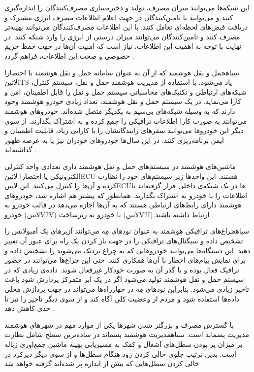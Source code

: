 این شبکه‌ها می‌توانند میزان مصرف، تولید و ذخیره‌سازی مصرف‌کنندگان را اندازه‌گیری کنند و می‌توانند با تامین‌کنندگان در جهت اعلام اطلاعات مصرف انرژی مشترک و دریافت قبض‌های لحظه‌ای تعامل کنند.
با این اطلاعات مصرف‌کنندگان می‌توانند بهینه‌تر مصرف کنند و تامین‌کنندگان می‌توانند میزان درستی از انرژی را وارد شبکه کنند.
در نهایت با توجه به اهمیت این اطلاعات، نیاز است که امنیت آن‌ها در جهت حفظ حریم خصوصی و صحت این اطلاعات، فراهم گردد
.


‌سیاه{حمل و نقل هوشمند} که از آن به عنوان سامانه حمل و نقل هوشمند یا اختصارا ‌لاتین{ITS} یاد می‌شود، با استفاده از مدیریت هوشمند حمل و نقل، سیستم کنترل، شبکه‌های ارتباطی و تکنیک‌های محاسباتی
سیستم حمل و نقل را قابل اطمینان، امن و کارا می‌نماید.
در یک سیستم حمل و نقل هوشمند، تعداد زیادی خودرو هوشمند وجود دارند که به وسیله شبکه‌های بی‌سیم به یکدیگر متصل شده‌اند. خودروهای هوشمند می‌توانند به صورت کارا اطلاعات ترافیکی را جمع کرده
و به اشتراک بگذارند. از سوی دیگر این خودروها می‌توانند سفر‌های رانندگانشان را با کارایی زیاد، قابلیت اطمینان و ایمن برنامه‌ریزی کنند. در این سال‌ها خودروهای خودران نیز پا به عرصه ظهور گذاشته‌اند
.

ماشین‌های هوشمند در سیستم‌های حمل و نقل هوشمند داری تعدادی واحد کنترلی الکترونیکی یا اختصارا ‌لاتین{ECU} هستند. این واحدها زیر سیستم‌های خود را نظارت کرده و آن‌ها را کنترل می‌کنند.
این ‌لاتین{ECU}ها در یک شبکه‌ی داخلی قرار گرفته‌اند تا اطلاعات را با خودرو به اشتراک بگذارند. همانطور که پیشتر هم اشاره شد، خودروهای هوشمند دارای رابط‌های ارتباطی هستند که به آن‌ها اجازه می‌دهد
در قالب خودرو به خودرو (‌لاتین{V2V}) یا خودرو به زیرساخت (‌لاتین{V2I}) ارتباط داشته باشند
.

‌سیاه{چراغ‌های ترافیکی} هوشمند به عنوان نودهای مِه می‌توانند آزیرهای یک آمبولانس را تشخیص داده و سیگنال‌های ترافیکی را در جهت باز کردن یک راه برای عبور آن تغییر دهند.
این دستگاه‌ها می‌توانند خودروهایی که به چراغ نزدیک می‌شوند را تشخیص داده و برای نمایش پیام‌های اخطار با آن‌ها همکاری کنند.
حتی این چراغ‌ها می‌توانند در حضور ترافیک فعال بوده و با گذر آن به صورت خودکار غیرفعال شوند.
داده‌ی زیادی که در سیستم حمل و نقل هوشمند تولید می‌شود اگر در یک ابر متمرکز پردازش شود باعث تاخیر زیادی می‌شود.
بنابراین نودهای مِه در چهارراه‌ها می‌تواند در جهت پردازش محلی داده‌ها استفاده شود و مردم از وعضیت کلی آگاه کند و از سوی دیگر تاخیر را نیز تا حدی کاهش دهد
.

با گسترش مصرف و بزرگتر شدن شهرها یکی از موارد مهم در شهرهای هوشمند مدیریت پسماند است. ‌سیاه{مدیریت هوشمند پسماند} در ساده‌ترین سطح شامل نظارت بر میزان پر بودن سطل‌های آشغال
و کمک به مسیریابی بهینه ماشین جمع‌اوری زباله است. بدین ترتیب جلوی خالی کردن زود هنگام سطل‌ها و از سوی دیگر دیرکرد در خالی کردن سطل‌هایی که بیش از اندازه پر شده‌اند گرفته خواهد شد.

